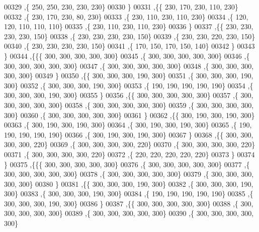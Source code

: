 \begin{DoxyCode}
00329    ,\{   250,   250,   230,   230,   230\}
00330    \}
00331   ,\{\{   230,   170,   230,   110,   230\}
00332    ,\{   230,   170,   230,    80,   230\}
00333    ,\{   230,   110,   230,   110,   230\}
00334    ,\{   120,   120,   110,   110,   110\}
00335    ,\{   230,   110,   230,   110,   230\}
00336    \}
00337   ,\{\{   230,   230,   230,   230,   150\}
00338    ,\{   230,   230,   230,   230,   150\}
00339    ,\{   230,   230,   220,   230,   150\}
00340    ,\{   230,   230,   230,   230,   150\}
00341    ,\{   170,   150,   170,   150,   140\}
00342    \}
00343   \}
00344  ,\{\{\{   300,   300,   300,   300,   300\}
00345    ,\{   300,   300,   300,   300,   300\}
00346    ,\{   300,   300,   300,   300,   300\}
00347    ,\{   300,   300,   300,   300,   300\}
00348    ,\{   300,   300,   300,   300,   300\}
00349    \}
00350   ,\{\{   300,   300,   300,   190,   300\}
00351    ,\{   300,   300,   300,   190,   300\}
00352    ,\{   300,   300,   300,   190,   300\}
00353    ,\{   190,   190,   190,   190,   190\}
00354    ,\{   300,   300,   300,   190,   300\}
00355    \}
00356   ,\{\{   300,   300,   300,   300,   300\}
00357    ,\{   300,   300,   300,   300,   300\}
00358    ,\{   300,   300,   300,   300,   300\}
00359    ,\{   300,   300,   300,   300,   300\}
00360    ,\{   300,   300,   300,   300,   300\}
00361    \}
00362   ,\{\{   300,   190,   300,   190,   300\}
00363    ,\{   300,   190,   300,   190,   300\}
00364    ,\{   300,   190,   300,   190,   300\}
00365    ,\{   190,   190,   190,   190,   190\}
00366    ,\{   300,   190,   300,   190,   300\}
00367    \}
00368   ,\{\{   300,   300,   300,   300,   220\}
00369    ,\{   300,   300,   300,   300,   220\}
00370    ,\{   300,   300,   300,   300,   220\}
00371    ,\{   300,   300,   300,   300,   220\}
00372    ,\{   220,   220,   220,   220,   220\}
00373    \}
00374   \}
00375  ,\{\{\{   300,   300,   300,   300,   300\}
00376    ,\{   300,   300,   300,   300,   300\}
00377    ,\{   300,   300,   300,   300,   300\}
00378    ,\{   300,   300,   300,   300,   300\}
00379    ,\{   300,   300,   300,   300,   300\}
00380    \}
00381   ,\{\{   300,   300,   300,   190,   300\}
00382    ,\{   300,   300,   300,   190,   300\}
00383    ,\{   300,   300,   300,   190,   300\}
00384    ,\{   190,   190,   190,   190,   190\}
00385    ,\{   300,   300,   300,   190,   300\}
00386    \}
00387   ,\{\{   300,   300,   300,   300,   300\}
00388    ,\{   300,   300,   300,   300,   300\}
00389    ,\{   300,   300,   300,   300,   300\}
00390    ,\{   300,   300,   300,   300,   300\}

\end{DoxyCode}
